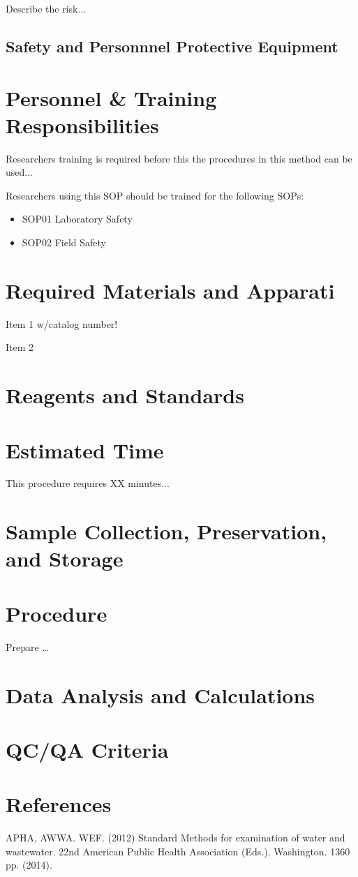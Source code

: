 \documentclass[12pt]{../SOP3_beta}
\begin{document}
\NP Describe the risk...


\subsection*{Safety and Personnnel Protective Equipment}


\section{Personnel \& Training Responsibilities}

\NP Researchers training is required before this the procedures in this method can be used... 

\NP Researchers using this SOP should be trained for the following SOPs:

\begin{itemize}
  \item SOP01 Laboratory Safety
  \item SOP02 Field Safety
\end{itemize}

\section{Required Materials and Apparati}

\NP Item 1 w/catalog number!

\NP Item 2

\section{Reagents and Standards}

\section{Estimated Time}

\NP This procedure requires XX minutes...

\section{Sample Collection, Preservation, and Storage}

\section{Procedure}

\NP Prepare \dots

\NP

\section{Data Analysis and Calculations}

\section{QC/QA Criteria}

\section{References}

\NP APHA, AWWA. WEF. (2012) Standard Methods for examination of water and wastewater. 22nd American Public Health Association (Eds.). Washington. 1360 pp. (2014).
\end{document}
